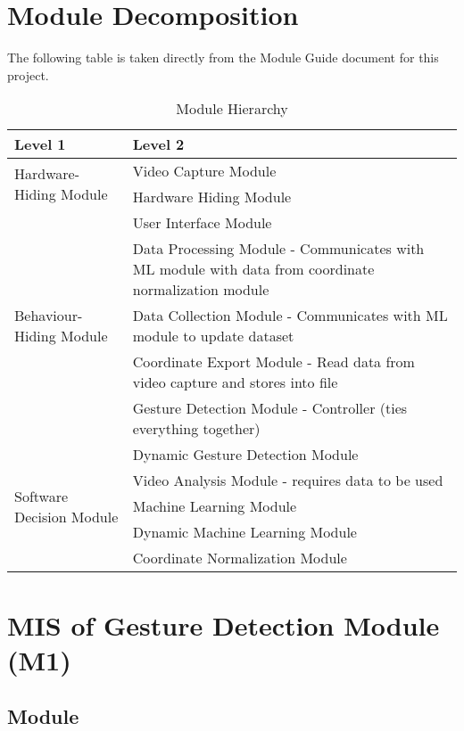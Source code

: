 \documentclass[12pt, titlepage]{article}
\begin{document}
\section{Module Decomposition}

The following table is taken directly from the Module Guide document for this project.

\begin{table}[h!]
\centering
\begin{tabular}{p{} p{}}
\toprule
\textbf{Level 1} & \textbf{Level 2}\\
\midrule
\multirow{2}{0.3\textwidth}{Hardware-Hiding Module} & Video Capture Module \\
& Hardware Hiding Module\\
\midrule
\multirow{5}{0.3\textwidth}{Behaviour-Hiding Module} & User Interface Module\\
& Data Processing Module - Communicates with ML module with data from coordinate normalization module\\
& Data Collection Module - Communicates with ML module to update dataset\\
& Coordinate Export Module - Read data from video capture and stores into file\\
& Gesture Detection Module - Controller (ties everything together)\\
& Dynamic Gesture Detection Module\\

\midrule

\multirow{3}{0.3\textwidth}{Software Decision Module} & Video Analysis Module - requires data to be used\\
& Machine Learning Module\\
& Dynamic Machine Learning Module\\
& Coordinate Normalization Module\\
\bottomrule


\end{tabular}
\caption{Module Hierarchy}
\label{TblMH}
\end{table}


\newpage

\section{MIS of Gesture Detection Module (M1)} \label{m1}

\subsection{Module}
\end{document}
